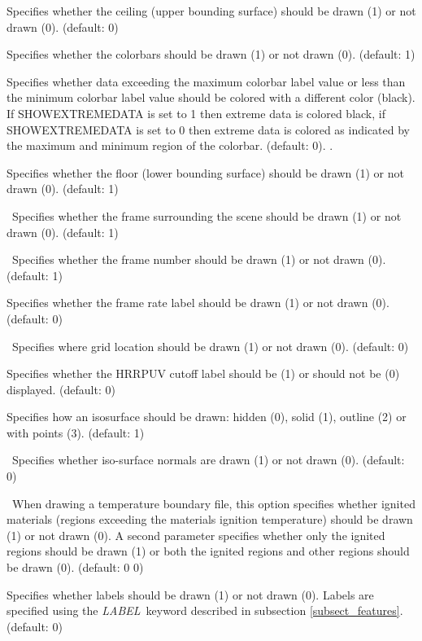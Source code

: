 \documentclass[11pt,twoside]{book}
\newcommand{\hitem}[1]{\item[{\bf #1} \hfill]}
\begin{document}
\hitem{SHOWCADANDGRID}

\hitem{SHOWCEILING}Specifies whether
the ceiling (upper bounding surface) should be drawn (1) or not drawn (0).
(default: 0)


\hitem{SHOWCOLORBARS}Specifies whether
the colorbars should be drawn (1) or not drawn (0).
(default: 1)

\hitem{SHOWEXTREMEDATA}Specifies whether data exceeding the maximum colorbar
label value or less than the minimum colorbar label value should be colored
with a different color (black).  If SHOWEXTREMEDATA is set to 1 then extreme
data is colored black, if SHOWEXTREMEDATA is set to 0 then extreme data is
colored as indicated by the maximum and minimum region of the colorbar. (default: 0).  .

\hitem{SHOWFLOOR}Specifies whether
the floor (lower bounding surface) should be drawn (1) or not drawn
(0).
(default: 1)

\hitem{SHOWFRAME}\ Specifies whether the frame surrounding
the scene should be drawn (1) or not drawn (0). (default:
1)

\hitem{SHOWFRAMELABEL}\ Specifies whether the frame number
should be drawn (1) or not drawn (0). (default: 1)

\hitem{SHOWFRAMERATE}Specifies whether
the frame rate label should be drawn (1) or not drawn (0).
(default: 0)

\hitem{SHOWGRIDLOC}\ Specifies where grid location should be drawn (1) or not
drawn (0). (default: 0)

\hitem{SHOWHRRCUTOFF}Specifies whether the HRRPUV cutoff label should be (1)
or should not be (0) displayed. (default: 0)

\hitem{SHOWISO}Specifies how an isosurface should be drawn: hidden (0),
solid (1), outline (2) or with points (3).  (default: 1)

\hitem{SHOWISONORMALS}\ Specifies whether iso-surface normals are drawn
(1) or not drawn (0).  (default: 0)

\hitem{SHOWIGNITION}\ When drawing a temperature boundary file, this option
specifies whether ignited materials (regions exceeding the materials
ignition temperature) should be drawn (1) or not drawn (0).
A second parameter specifies whether only the ignited regions
should be drawn (1) or both the ignited regions and other regions should be drawn (0).
(default: 0 0)


\hitem{SHOWLABELS}Specifies whether labels should be drawn (1) or
not drawn (0).  Labels are specified using the {\em LABEL}\
keyword described in subsection \ref{subsect_features}. (default:
0)
\end{document}
